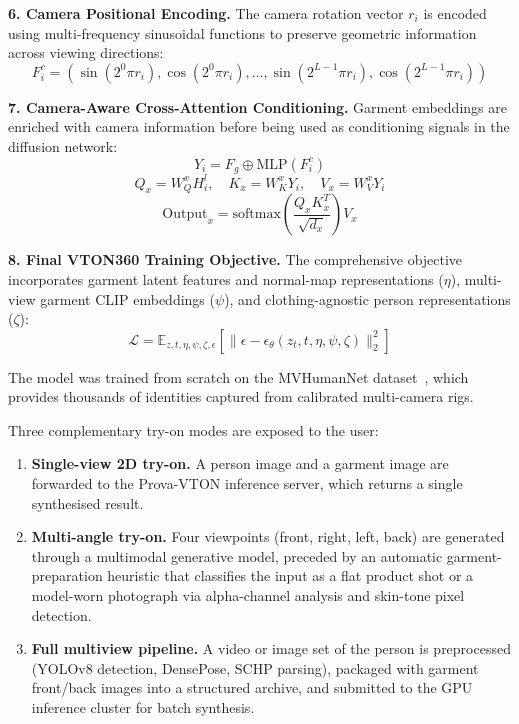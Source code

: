 \textbf{6. Camera Positional Encoding.} The camera rotation vector $r_i$ is encoded using multi-frequency sinusoidal functions to preserve geometric information across viewing directions:
\begin{equation}
    F_i^c = \left(\sin(2^0\pi r_i), \cos(2^0\pi r_i), \dots, \sin(2^{L-1}\pi r_i), \cos(2^{L-1}\pi r_i)\right)
\end{equation}

\textbf{7. Camera-Aware Cross-Attention Conditioning.} Garment embeddings are enriched with camera information before being used as conditioning signals in the diffusion network:
\begin{equation}
    Y_i = F_g \oplus \text{MLP}(F_i^c)
\end{equation}
\begin{equation}
    Q_x = W_Q^x H_i^l, \quad K_x = W_K^x Y_i, \quad V_x = W_V^x Y_i
\end{equation}
\begin{equation}
    \text{Output}_x = \text{softmax}\left(\frac{Q_x K_x^T}{\sqrt{d_x}}\right) V_x
\end{equation}

\textbf{8. Final VTON360 Training Objective.} The comprehensive objective incorporates garment latent features and normal-map representations ($\eta$), multi-view garment CLIP embeddings ($\psi$), and clothing-agnostic person representations ($\zeta$):
\begin{equation}
    \mathcal{L} = \mathbb{E}_{z,t,\eta,\psi,\zeta,\epsilon} \left[ \|\epsilon - \epsilon_{\theta}(z_t, t, \eta, \psi, \zeta)\|_2^2 \right]
\end{equation}

The model was trained from scratch on the MVHumanNet dataset~\cite{zheng2024mvhumannet}, which provides thousands of identities captured from calibrated multi-camera rigs.

Three complementary try-on modes are exposed to the user:

\begin{enumerate}[leftmargin=*]
    \item \textbf{Single-view 2D try-on.} A person image and a garment image are forwarded to the Prova-VTON inference server, which returns a single synthesised result.
    \item \textbf{Multi-angle try-on.} Four viewpoints (front, right, left, back) are generated through a multimodal generative model, preceded by an automatic garment-preparation heuristic that classifies the input as a flat product shot or a model-worn photograph via alpha-channel analysis and skin-tone pixel detection.
    \item \textbf{Full multiview pipeline.} A video or image set of the person is preprocessed (YOLOv8 detection, DensePose, SCHP parsing), packaged with garment front/back images into a structured archive, and submitted to the GPU inference cluster for batch synthesis.
\end{enumerate}

